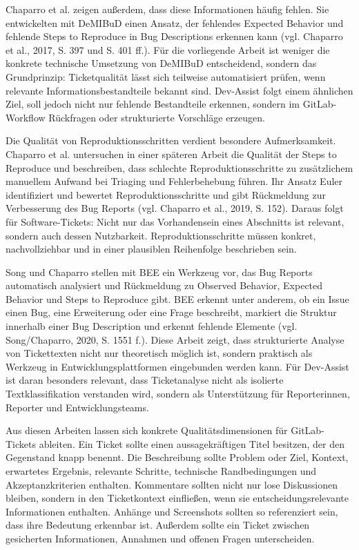 \documentclass[12pt,a4paper,oneside]{scrreprt}
\begin{document}
Chaparro et al. zeigen außerdem, dass diese Informationen häufig fehlen. Sie entwickelten mit DeMIBuD einen Ansatz, der fehlendes Expected Behavior und fehlende Steps to Reproduce in Bug Descriptions erkennen kann (vgl. Chaparro et al., 2017, S. 397 und S. 401 ff.). Für die vorliegende Arbeit ist weniger die konkrete technische Umsetzung von DeMIBuD entscheidend, sondern das Grundprinzip: Ticketqualität lässt sich teilweise automatisiert prüfen, wenn relevante Informationsbestandteile bekannt sind. Dev-Assist folgt einem ähnlichen Ziel, soll jedoch nicht nur fehlende Bestandteile erkennen, sondern im GitLab-Workflow Rückfragen oder strukturierte Vorschläge erzeugen.

Die Qualität von Reproduktionsschritten verdient besondere Aufmerksamkeit. Chaparro et al. untersuchen in einer späteren Arbeit die Qualität der Steps to Reproduce und beschreiben, dass schlechte Reproduktionsschritte zu zusätzlichem manuellem Aufwand bei Triaging und Fehlerbehebung führen. Ihr Ansatz Euler identifiziert und bewertet Reproduktionsschritte und gibt Rückmeldung zur Verbesserung des Bug Reports (vgl. Chaparro et al., 2019, S. 152). Daraus folgt für Software-Tickets: Nicht nur das Vorhandensein eines Abschnitts ist relevant, sondern auch dessen Nutzbarkeit. Reproduktionsschritte müssen konkret, nachvollziehbar und in einer plausiblen Reihenfolge beschrieben sein.

Song und Chaparro stellen mit BEE ein Werkzeug vor, das Bug Reports automatisch analysiert und Rückmeldung zu Observed Behavior, Expected Behavior und Steps to Reproduce gibt. BEE erkennt unter anderem, ob ein Issue einen Bug, eine Erweiterung oder eine Frage beschreibt, markiert die Struktur innerhalb einer Bug Description und erkennt fehlende Elemente (vgl. Song/Chaparro, 2020, S. 1551 f.). Diese Arbeit zeigt, dass strukturierte Analyse von Tickettexten nicht nur theoretisch möglich ist, sondern praktisch als Werkzeug in Entwicklungsplattformen eingebunden werden kann. Für Dev-Assist ist daran besonders relevant, dass Ticketanalyse nicht als isolierte Textklassifikation verstanden wird, sondern als Unterstützung für Reporterinnen, Reporter und Entwicklungsteams.

Aus diesen Arbeiten lassen sich konkrete Qualitätsdimensionen für GitLab-Tickets ableiten. Ein Ticket sollte einen aussagekräftigen Titel besitzen, der den Gegenstand knapp benennt. Die Beschreibung sollte Problem oder Ziel, Kontext, erwartetes Ergebnis, relevante Schritte, technische Randbedingungen und Akzeptanzkriterien enthalten. Kommentare sollten nicht nur lose Diskussionen bleiben, sondern in den Ticketkontext einfließen, wenn sie entscheidungsrelevante Informationen enthalten. Anhänge und Screenshots sollten so referenziert sein, dass ihre Bedeutung erkennbar ist. Außerdem sollte ein Ticket zwischen gesicherten Informationen, Annahmen und offenen Fragen unterscheiden.
\end{document}
